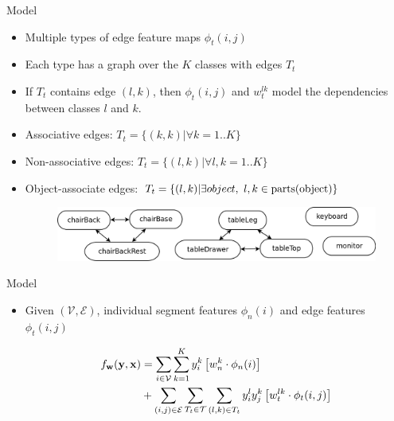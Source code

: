 \documentclass{beamer}
\newcommand{\x}{{\mathbf x}}     %
\newcommand{\y}{{\mathbf y}}     %
\newcommand{\ysc}[2]{{y_{#1}^{#2}}}    %
\newcommand{\fn}[1]{{\phi_n(#1)}}      %
\newcommand{\fe}[3]{{\phi_{#1}(#2,#3)}}%
\newcommand{\w}{{\mathbf w}}           %
\newcommand{\wn}[1]{{w_n^{#1}}}        %
\newcommand{\we}[3]{{w_{#1}^{#2#3}}}   %
\newcommand{\df}[3]{{f_{#3}(#1,#2)}}   %
\begin{document}
\begin{frame}{Model}

\begin{itemize}

\item Multiple types of edge feature maps $\fe{t}{i}{j}$
\item Each type has a graph over the $K$ classes with edges  $T_t$
\item If $T_t$ contains edge $(l,k)$, then $\fe{t}{i}{j}$ and $\we{t}{l}{k}$  model the dependencies between classes $l$ and $k$.
\item Associative edges:  ${T_t}=\{(k,k)| \forall k=1..K\}$
\item Non-associative edges: $T_t=\{(l,k)| \forall l,k=1..K\}$
\item Object-associate edges: $T_t=\{(l,k) | \exists object , ~ l,k\in {\rm parts}({\rm object})\}$

\begin{figure}
		\includegraphics[width=.8\linewidth]{objAssoc.png}
	\end{figure}

\end{itemize}
\end{frame}

\begin{frame}{Model}
\begin{itemize}

\item Given $(\mathcal{V},\mathcal{E})$, individual segment features $\fn{i}$ and edge features $\fe{t}{i}{j}$

\begin{equation} \label{eq:model}
\begin{split}
\df{\y}{\x}{\w} & = \sum_{i \in \mathcal{V}} \sum_{k=1}^{K} \ysc{i}{k} \left[\wn{k} \cdot \fn{i} \right] \\
 & + \sum_{(i,j)\in \mathcal{E}}   \sum_{T_t \in {\cal T}}  \sum_{(l,k)\in T_t} \ysc{i}{l} \ysc{j}{k}  \left[\we{t}{l}{k} \cdot \fe{t}{i}{j}\right] 
 \end{split}
\end{equation}
\end{itemize}
\end{frame}
\end{document}
